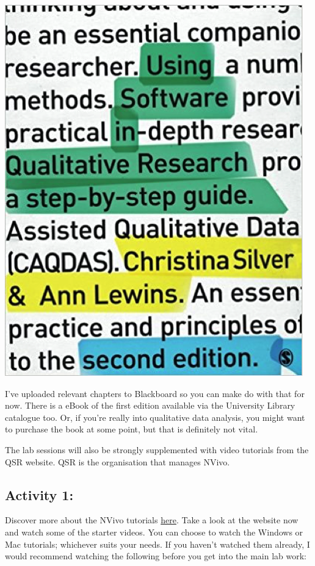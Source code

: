 \documentclass[]{book}
\theoremstyle{definition}
\theoremstyle{definition}
\theoremstyle{definition}
\theoremstyle{remark}
\begin{document}
\includegraphics{imgs/qual_01.png}

I've uploaded relevant chapters to Blackboard so you can make do with
that for now. There is a eBook of the first edition available via the
University Library catalogue too. Or, if you're really into qualitative
data analysis, you might want to purchase the book at some point, but
that is definitely not vital.

The lab sessions will also be strongly supplemented with video tutorials
from the QSR website. QSR is the organisation that manages NVivo.

\hypertarget{activity-1}{%
\subsection{Activity 1:}\label{activity-1}}

Discover more about the NVivo tutorials
\href{https://www.qsrinternational.com/nvivo/free-nvivo-resources/tutorials}{here}.
Take a look at the website now and watch some of the starter videos. You
can choose to watch the Windows or Mac tutorials; whichever suits your
needs. If you haven't watched them already, I would recommend watching
the following before you get into the main lab work:
\end{document}
